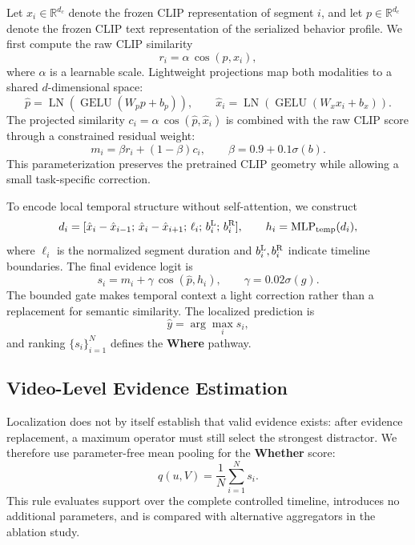 Let $x_i\in\mathbb R^{d_c}$ denote the frozen CLIP representation of segment $i$, and let $p\in\mathbb R^{d_c}$ denote the frozen CLIP text representation of the serialized behavior profile. We first compute the raw CLIP similarity
\begin{equation}
r_i=\alpha\,\operatorname{cos}(p,x_i),
\label{eq:raw-clip}
\end{equation}
where $\alpha$ is a learnable scale. Lightweight projections map both modalities to a shared $d$-dimensional space:
\begin{equation}
\hat p=\operatorname{LN}(\operatorname{GELU}(W_p p+b_p)),
\qquad
\hat x_i=\operatorname{LN}(\operatorname{GELU}(W_x x_i+b_x)).
\end{equation}
The projected similarity $c_i=\alpha\,\operatorname{cos}(\hat p,\hat x_i)$ is combined with the raw CLIP score through a constrained residual weight:
\begin{equation}
m_i=\beta r_i+(1-\beta)c_i,
\qquad
\beta=0.9+0.1\sigma(b).
\label{eq:clip-residual}
\end{equation}
This parameterization preserves the pretrained CLIP geometry while allowing a small task-specific correction.

To encode local temporal structure without self-attention, we construct
\begin{equation}
d_i=
[\hat x_i-\hat x_{i-1};\,
 \hat x_i-\hat x_{i+1};\,
 \ell_i;\,b_i^{\rm L};\,b_i^{\rm R}],
\qquad
h_i=\operatorname{MLP}_{\rm temp}(d_i),
\label{eq:relative-temporal}
\end{equation}
where $\ell_i$ is the normalized segment duration and $b_i^{\rm L},b_i^{\rm R}$ indicate timeline boundaries. The final evidence logit is
\begin{equation}
s_i=m_i+\gamma\,\operatorname{cos}(\hat p,h_i),
\qquad
\gamma=0.02\sigma(g).
\label{eq:segment-score}
\end{equation}
The bounded gate makes temporal context a light correction rather than a replacement for semantic similarity. The localized prediction is
\begin{equation}
\hat y=\arg\max_i s_i,
\end{equation}
and ranking $\{s_i\}_{i=1}^{N}$ defines the \textbf{Where} pathway.

\subsection{Video-Level Evidence Estimation}

Localization does not by itself establish that valid evidence exists: after evidence replacement, a maximum operator must still select the strongest distractor. We therefore use parameter-free mean pooling for the \textbf{Whether} score:
\begin{equation}
q(u,V)=\frac{1}{N}\sum_{i=1}^{N}s_i.
\label{eq:mean-pool}
\end{equation}
This rule evaluates support over the complete controlled timeline, introduces no additional parameters, and is compared with alternative aggregators in the ablation study.

